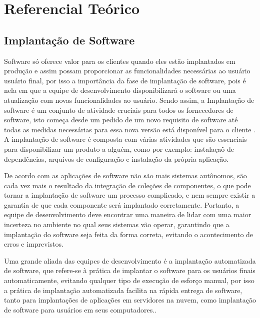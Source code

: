 \chapter{Referencial Teórico}
\label{cap-referencial}

\section{Implantação de Software}

Software só oferece valor para os clientes quando eles estão implantados em produção
e assim possam proporcionar as funcionalidades necessárias ao usuário usuário final,
por isso a importância da fase de implantação de software, pois é nela em que a equipe
de desenvolvimento disponibilizará o software ou uma atualização com novas funcionalidades
ao usuário. Sendo assim, a Implantação de software é um conjunto de atividade cruciais
para todos os fornecedores de software, isto começa desde um pedido de um novo requisito
de software até todas as medidas necessárias para essa nova versão está disponível
para o cliente \cite{5741269}. A implantação de software é composta com várias
atividades que são essenciais para disponibilizar um produto a alguém, como por exemplo:
instalaçaõ de dependências, arquivos de configuração e instalação da própria aplicação.

De acordo com \cite{deployment1998} as aplicações de software não são mais
sistemas autônomos, são cada vez mais o resultado da integração de coleções de
componentes, o que pode tornar a implantação de software um processo complicado, e
nem sempre existir a garantia de que cada componente será implantado corretamente.
Portanto, a equipe de desenvolvimento deve encontrar uma maneira de lidar
com uma maior incerteza no ambiente no qual seus sistemas vão operar, garantindo
que a implantação do software seja feita da forma correta, evitando o acontecimento
de erros e imprevistos.

Uma grande aliada das equipes de desenvolvimento é a implantação automatizada de
software, que  refere-se à prática de implantar o software para os usuários finais
automaticamente, evitando qualquer tipo de execução de esforço manual, por isso
a prática de implantação automatizada facilita na rápida entrega de software, tanto
para implantações de aplicações em servidores na nuvem, como implantação de software
para usuários em seus computadores.\cite{7284592}.


